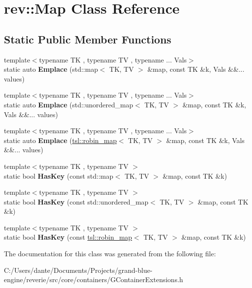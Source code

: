 \hypertarget{classrev_1_1_map}{}\section{rev\+::Map Class Reference}
\label{classrev_1_1_map}
\subsection*{Static Public Member Functions}
\begin{DoxyCompactItemize}
\item 
\mbox{\label{classrev_1_1_map_a40df700309577c85816d2d71c3dbf7da}} 
{\footnotesize template$<$typename TK , typename TV , typename ... Vals$>$ }\\static auto {\bfseries Emplace} (std\+::map$<$ TK, TV $>$ \&map, const TK \&k, Vals \&\&... values)
\item 
\mbox{\label{classrev_1_1_map_a74b18a2bef639b0ea0536e3b71f54941}} 
{\footnotesize template$<$typename TK , typename TV , typename ... Vals$>$ }\\static auto {\bfseries Emplace} (std\+::unordered\+\_\+map$<$ TK, TV $>$ \&map, const TK \&k, Vals \&\&... values)
\item 
\mbox{\label{classrev_1_1_map_a0fb6a84d988a5c52d2f769e724f02efb}} 
{\footnotesize template$<$typename TK , typename TV , typename ... Vals$>$ }\\static auto {\bfseries Emplace} (\mbox{\hyperlink{classtsl_1_1robin__map}{tsl\+::robin\+\_\+map}}$<$ TK, TV $>$ \&map, const TK \&k, Vals \&\&... values)
\item 
\mbox{\label{classrev_1_1_map_a763653cc75671a7e737894b7762e0543}} 
{\footnotesize template$<$typename TK , typename TV $>$ }\\static bool {\bfseries Has\+Key} (const std\+::map$<$ TK, TV $>$ \&map, const TK \&k)
\item 
\mbox{\label{classrev_1_1_map_a654509ee00849c962e6bcafb9b8b6054}} 
{\footnotesize template$<$typename TK , typename TV $>$ }\\static bool {\bfseries Has\+Key} (const std\+::unordered\+\_\+map$<$ TK, TV $>$ \&map, const TK \&k)
\item 
\mbox{\label{classrev_1_1_map_a6247978304c8f365942c1c87872f6a5b}} 
{\footnotesize template$<$typename TK , typename TV $>$ }\\static bool {\bfseries Has\+Key} (const \mbox{\hyperlink{classtsl_1_1robin__map}{tsl\+::robin\+\_\+map}}$<$ TK, TV $>$ \&map, const TK \&k)
\end{DoxyCompactItemize}


The documentation for this class was generated from the following file\+:\begin{DoxyCompactItemize}
\item 
C\+:/\+Users/dante/\+Documents/\+Projects/grand-\/blue-\/engine/reverie/src/core/containers/G\+Container\+Extensions.\+h\end{DoxyCompactItemize}

